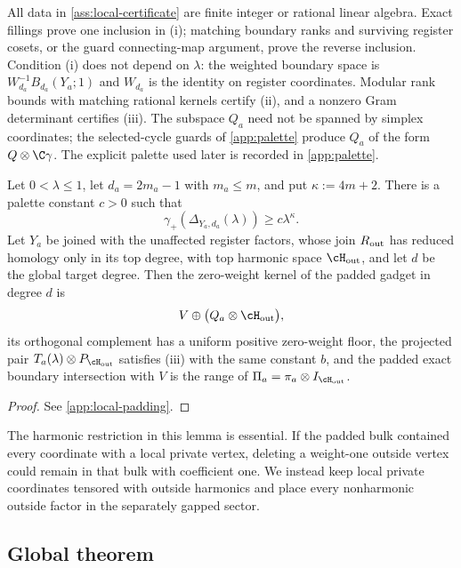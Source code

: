 All data in \cref{ass:local-certificate} are finite integer or rational linear
algebra.  Exact fillings prove one inclusion in (i); matching boundary ranks
and surviving register cosets, or the guard connecting-map argument, prove the
reverse inclusion.  Condition (i) does not depend on \(\lambda\): the
weighted boundary space is \(W_{d_a}^{-1}B_{d_a}(Y_a;1)\) and \(W_{d_a}\)
is the identity on register coordinates.  Modular rank bounds with matching
rational kernels certify (ii), and a nonzero Gram determinant certifies
(iii).  The subspace \(Q_a\) need not be spanned by simplex coordinates; the
selected-cycle guards of \cref{app:palette} produce \(Q_a\) of the form
\(Q\otimes\C\gamma\).  The explicit palette used later is recorded in
\cref{app:palette}.

\begin{lemma}
\label{lem:scaling-padding}
Let \(0<\lambda\le1\), let \(d_a=2m_a-1\) with \(m_a\le m\), and put
\(\kappa:=4m+2\).  There is a palette constant \(c>0\) such that
\begin{equation}
\label{eq:local-gap}
\gamma_+\!\left(\Delta_{Y_a,d_a}(\lambda)\right)
\ge c\lambda^\kappa .
\end{equation}
Let \(Y_a\) be joined with the unaffected register factors, whose join
\(R_{\rm out}\) has reduced homology only in its top degree, with top
harmonic space \(\cH_{\rm out}\), and let \(d\) be the global target degree.
Then the zero-weight kernel of the padded gadget in degree \(d\) is
\[
V\oplus\bigl(Q_a\otimes\cH_{\rm out}\bigr),
\]
its orthogonal complement has a uniform positive zero-weight floor, the
projected pair \(T_a(\lambda)\otimes P_{\cH_{\rm out}}\) satisfies (iii)
with the same constant \(b\), and the padded exact boundary intersection
with \(V\) is the range of
\(\Pi_a=\pi_a\otimes I_{\cH_{\rm out}}\).
\end{lemma}

\begin{proof}
See \cref{app:local-padding}.
\end{proof}

The harmonic restriction in this lemma is essential.  If the padded bulk
contained every coordinate with a local private vertex, deleting a weight-one
outside vertex could remain in that bulk with coefficient one.  We instead
keep local private coordinates tensored with outside harmonics and place every
nonharmonic outside factor in the separately gapped sector.

\subsection{Global theorem}

